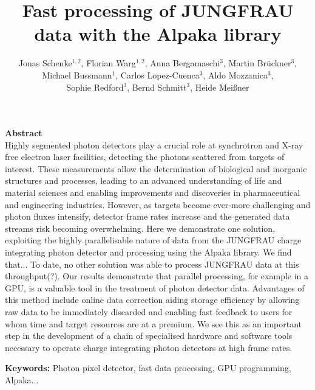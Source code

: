 \documentclass[a4paper]{article}
\begin{document}
\title{Fast processing of JUNGFRAU data with the Alpaka library}
\author{Jonas Schenke$^{1,2}$, 
Florian Warg$^{1,2}$, 
Anna Bergamaschi$^3$,
Martin Br\"uckner$^3$,\\
Michael Bussmann$^1$,
Carlos Lopez-Cuenca$^3$,
Aldo Mozzanica$^3$,\\
Sophie Redford$^3$,
Bernd Schmitt$^3$,
Heide Mei{\ss}ner}




\date{}

\renewcommand\Affilfont{\itshape}



\maketitle
{\bf Abstract}\\
Highly segmented photon detectors play a crucial role at synchrotron and X-ray free electron laser facilities, detecting the photons scattered from targets of interest. These measurements allow the determination of biological and inorganic structures and processes, leading to an advanced understanding of life and material sciences and enabling improvements and discoveries in pharmaceutical and engineering industries. However, as targets become ever-more challenging and photon fluxes intensify, detector frame rates increase and the generated data streams risk becoming overwhelming. Here we demonstrate one solution, exploiting the highly parallelisable nature of data from the JUNGFRAU charge integrating photon detector and processing using the Alpaka library. We find that... To date, no other solution was able to process JUNGFRAU data at this throughput(?). Our results demonstrate that parallel processing, for example in a GPU, is a valuable tool in the treatment of photon detector data. Advantages of this method include online data correction aiding storage efficiency by allowing raw data to be immediately discarded and enabling fast feedback to users for whom time and target resources are at a premium. We see this as an important step in the development of a chain of specialised hardware and software tools necessary to operate charge integrating photon detectors at high frame rates.

{\bf Keywords:} Photon pixel detector, fast data processing, GPU programming, Alpaka...
\end{document}
